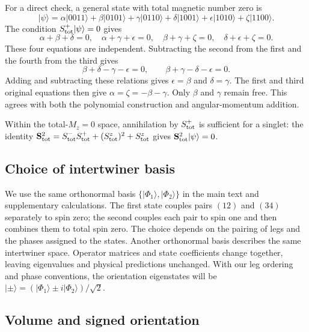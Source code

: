 For a direct check, a general state with total magnetic number zero is
\begin{equation}
 |\psi\rangle=\alpha|0011\rangle+\beta|0101\rangle
 +\gamma|0110\rangle+\delta|1001\rangle
 +\epsilon|1010\rangle+\zeta|1100\rangle.
\end{equation}
The condition $S^+_{\rm tot}|\psi\rangle=0$ gives
\begin{equation}
 \alpha+\beta+\delta=0,\quad \alpha+\gamma+\epsilon=0,\quad
 \beta+\gamma+\zeta=0,\quad \delta+\epsilon+\zeta=0.
\end{equation}
These four equations are independent. Subtracting the second from the
first and the fourth from the third gives
\begin{equation}
 \beta+\delta-\gamma-\epsilon=0,\qquad
 \beta+\gamma-\delta-\epsilon=0.
\end{equation}
Adding and subtracting these relations gives $\epsilon=\beta$ and
$\delta=\gamma$. The first and third original equations then give
$\alpha=\zeta=-\beta-\gamma$. Only $\beta$ and $\gamma$ remain free.
This agrees with both the polynomial construction and angular-momentum addition.

Within the total-$M_z=0$ space, annihilation by $S^+_{\rm tot}$ is sufficient
for a singlet: the identity
$\mathbf S_{\rm tot}^2=S^-_{\rm tot}S^+_{\rm tot}
 +(S^z_{\rm tot})^2+S^z_{\rm tot}$ gives
$\mathbf S_{\rm tot}^2|\psi\rangle=0$.



\subsection{Choice of intertwiner basis}
\label{sub:manuscript-states}

We use the same orthonormal basis $\{|\Phi_1\rangle,|\Phi_2\rangle\}$ in
the main text and supplementary calculations. The first state couples
pairs $(12)$ and $(34)$ separately to spin zero; the second couples each
pair to spin one and then combines them to total spin zero.
The choice depends on the pairing of legs and the phases assigned to
the states. Another orthonormal basis describes the same intertwiner
space. Operator matrices and state coefficients change together, leaving
eigenvalues and physical predictions unchanged. With our leg ordering
and phase conventions, the orientation eigenstates will be
$|\pm\rangle=(|\Phi_1\rangle\pm i|\Phi_2\rangle)/\sqrt2$.

\subsection{Volume and signed orientation}
\label{sub:volume}

